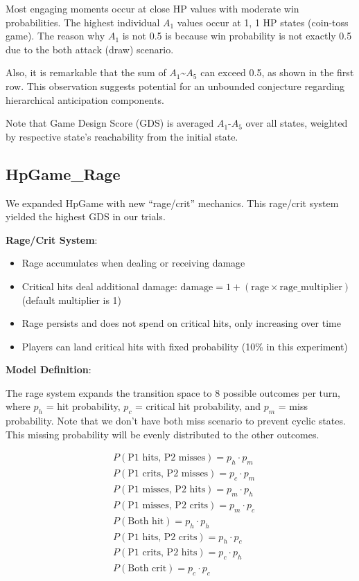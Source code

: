 \documentclass{article}
\begin{document}
Most engaging moments occur at close HP values with moderate win probabilities. The highest individual $A_1$ values occur at 1, 1 HP states (coin-toss game). The reason why $A_1$ is not 0.5 is because win probability is not exactly 0.5 due to the both attack (draw) scenario.

Also, it is remarkable that the sum of $A_1$\textasciitilde$A_5$ can exceed 0.5, as shown in the first row. This observation suggests potential for an unbounded conjecture regarding hierarchical anticipation components.

Note that Game Design Score (GDS) is averaged $A_1$-$A_5$ over all states, weighted by respective state's reachability from the initial state.

\subsection{HpGame\_Rage}

We expanded HpGame with new ``rage/crit'' mechanics. This rage/crit system yielded the highest GDS in our trials.

\textbf{Rage/Crit System}: 
\begin{itemize}
\item Rage accumulates when dealing or receiving damage
\item Critical hits deal additional damage: $\text{damage} = 1 + (\text{rage} \times \text{rage\_multiplier})$ (default multiplier is 1)
\item Rage persists and does not spend on critical hits, only increasing over time
\item Players can land critical hits with fixed probability (10\% in this experiment)
\end{itemize}

\textbf{Model Definition}: 

The rage system expands the transition space to 8 possible outcomes per turn, where $p_h$ = hit probability, $p_c$ = critical hit probability, and $p_m$ = miss probability.
Note that we don't have both miss scenario to prevent cyclic states. This missing probability will be evenly distributed to the other outcomes.

\begin{align}
&P(\text{P1 hits, P2 misses}) = p_h \cdot p_m \\
&P(\text{P1 crits, P2 misses}) = p_c \cdot p_m \\
&P(\text{P1 misses, P2 hits}) = p_m \cdot p_h \\
&P(\text{P1 misses, P2 crits}) = p_m \cdot p_c \\
&P(\text{Both hit}) = p_h \cdot p_h \\
&P(\text{P1 hits, P2 crits}) = p_h \cdot p_c \\
&P(\text{P1 crits, P2 hits}) = p_c \cdot p_h \\
&P(\text{Both crit}) = p_c \cdot p_c
\end{align}
\end{document}
